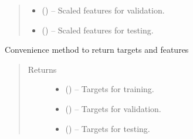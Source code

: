 \documentclass[letterpaper,10pt,english]{sphinxmanual}
\begin{document}
\begin{fulllineitems}
\begin{fulllineitems}
\begin{quote}
\begin{description}
\begin{itemize}
\item {} 
 () -- Scaled features for validation.

\item {} 
 () -- Scaled features for testing.

\end{itemize}


\end{description}\end{quote}

\end{fulllineitems}


\begin{fulllineitems}
\label{\detokenize{api/ucf.TrainingDataSets:ucf.TrainingDataSets.get_targets}}
Convenience method to return targets and features
\begin{quote}\begin{description}
\item[{Returns}] \leavevmode
\begin{itemize}
\item {} 
 () -- Targets for training.

\item {} 
 () -- Targets for validation.

\item {} 
 () -- Targets for testing.

\end{itemize}


\end{description}\end{quote}

\end{fulllineitems}



\end{fulllineitems}
\end{document}
